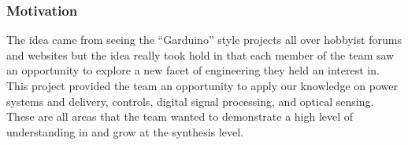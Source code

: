 \subsubsection{Motivation}
The idea came from seeing the ``Garduino'' style projects all over hobbyist forums and websites but the idea really took hold in that each member of the team saw an opportunity to explore a new facet of engineering they held an interest in. This project provided the team an opportunity to apply our knowledge on power systems and delivery, controls, digital signal processing, and optical sensing. These are all areas that the team wanted to demonstrate a high level of understanding in and grow at the synthesis level.